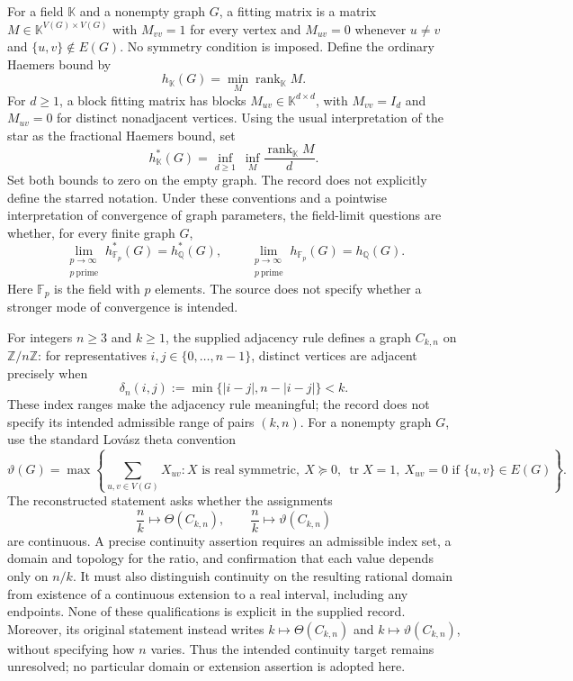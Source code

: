 \documentclass[11pt]{article}
\newcommand{\Z}{\mathbb{Z}}
\newcommand{\Q}{\mathbb{Q}}
\newcommand{\F}{\mathbb{F}}
\begin{document}
For a field \(\mathbb K\) and a nonempty graph \(G\), a fitting matrix is a matrix \(M\in\mathbb K^{V(G)\times V(G)}\) with \(M_{vv}=1\) for every vertex and \(M_{uv}=0\) whenever \(u\ne v\) and \(\{u,v\}\notin E(G)\). No symmetry condition is imposed. Define the ordinary Haemers bound by
\[
h_{\mathbb K}(G)=\min_M\operatorname{rank}_{\mathbb K}M.
\]
For \(d\geq1\), a block fitting matrix has blocks \(M_{uv}\in\mathbb K^{d\times d}\), with \(M_{vv}=I_d\) and \(M_{uv}=0\) for distinct nonadjacent vertices. Using the usual interpretation of the star as the fractional Haemers bound, set
\[
h_{\mathbb K}^{*}(G)=\inf_{d\geq1}\ \inf_M\frac{\operatorname{rank}_{\mathbb K}M}{d}.
\]
Set both bounds to zero on the empty graph. The record does not explicitly define the starred notation. Under these conventions and a pointwise interpretation of convergence of graph parameters, the field-limit questions are whether, for every finite graph \(G\),
\[
\lim_{\substack{p\to\infty\\p\ \mathrm{prime}}}h_{\F_p}^{*}(G)=h_{\Q}^{*}(G),
\qquad
\lim_{\substack{p\to\infty\\p\ \mathrm{prime}}}h_{\F_p}(G)=h_{\Q}(G).
\]
Here \(\F_p\) is the field with \(p\) elements. The source does not specify whether a stronger mode of convergence is intended.

For integers \(n\geq3\) and \(k\geq1\), the supplied adjacency rule defines a graph \(C_{k,n}\) on \(\Z/n\Z\): for representatives \(i,j\in\{0,\ldots,n-1\}\), distinct vertices are adjacent precisely when
\[
\delta_n(i,j):=\min\{|i-j|,n-|i-j|\}<k.
\]
These index ranges make the adjacency rule meaningful; the record does not specify its intended admissible range of pairs \((k,n)\). For a nonempty graph \(G\), use the standard Lov\'asz theta convention
\[
\vartheta(G)=\max\left\{\sum_{u,v\in V(G)}X_{uv}: X\text{ is real symmetric},\ X\succeq0,\ \operatorname{tr}X=1,\ X_{uv}=0\text{ if }\{u,v\}\in E(G)\right\}.
\]
The reconstructed statement asks whether the assignments
\[
\frac nk\longmapsto\Theta(C_{k,n}),\qquad
\frac nk\longmapsto\vartheta(C_{k,n})
\]
are continuous. A precise continuity assertion requires an admissible index set, a domain and topology for the ratio, and confirmation that each value depends only on \(n/k\). It must also distinguish continuity on the resulting rational domain from existence of a continuous extension to a real interval, including any endpoints. None of these qualifications is explicit in the supplied record. Moreover, its original statement instead writes \(k\mapsto\Theta(C_{k,n})\) and \(k\mapsto\vartheta(C_{k,n})\), without specifying how \(n\) varies. Thus the intended continuity target remains unresolved; no particular domain or extension assertion is adopted here.
\end{document}
